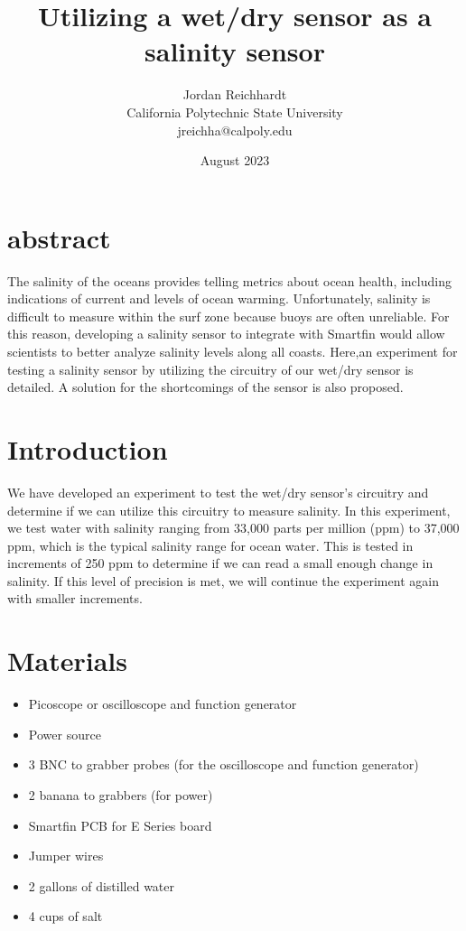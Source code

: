 \documentclass[twocolumn]{article}
\title{Utilizing a wet/dry sensor as a salinity sensor}
\author{Jordan Reichhardt\\California Polytechnic State University\\jreichha@calpoly.edu}
\date{August 2023}
\begin{document}
\maketitle


\section{abstract}
The salinity of the oceans provides telling metrics about ocean health, including indications of current and levels of ocean warming. Unfortunately, salinity is difficult to measure within the surf zone because buoys are often unreliable. For this reason, developing a salinity sensor to integrate with Smartfin would allow scientists to better analyze salinity levels along all coasts. Here,an experiment for testing a salinity sensor by utilizing the circuitry of our wet/dry sensor is detailed. A solution for the shortcomings of the sensor is also proposed.


\maketitle

\section{Introduction}
We have developed an experiment to test the wet/dry sensor's circuitry and determine if we can utilize this circuitry to measure salinity. In this experiment, we test water with salinity ranging from 33,000 parts per million (ppm) to 37,000 ppm, which is the typical salinity range for ocean water. This is tested in increments of 250 ppm to determine if we can read a small enough change in salinity. If this level of precision is met, we will continue the experiment again with smaller increments.

\section{Materials}
\begin{itemize}
    \item  Picoscope or oscilloscope and function generator
    \item Power source
    \item 3 BNC to grabber probes (for the oscilloscope and function generator)
    \item 2 banana to grabbers (for power)
    \item Smartfin PCB for E Series board
    \item Jumper wires
    \item 2 gallons of distilled water
    \item 4 cups of salt
\end{itemize}
\end{document}
